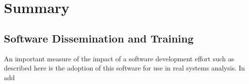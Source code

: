 \section{Summary}
\subsection{Software Dissemination and Training}

An important measure of the impact of a software development effort such as
described here is the adoption of this software for use in real systems
analysis.  In add
